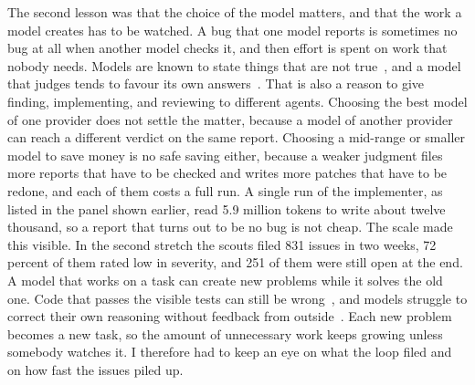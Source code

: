 \documentclass[11pt,a4paper]{article}
\begin{document}
The second lesson was that the choice of the model matters, and that the work a model creates has
to be watched.
A bug that one model reports is sometimes no bug at all when another model checks it, and then
effort is spent on work that nobody needs.
Models are known to state things that are not true~\cite{ji2023hallucination}, and a model that
judges tends to favour its own answers~\cite{zheng2023judge}.
That is also a reason to give finding, implementing, and reviewing to different agents.
Choosing the best model of one provider does not settle the matter, because a model of another
provider can reach a different verdict on the same report.
Choosing a mid-range or smaller model to save money is no safe saving either, because a weaker
judgment files more reports that have to be checked and writes more patches that have to be
redone, and each of them costs a full run.
A single run of the implementer, as listed in the panel shown earlier, read 5.9 million tokens to
write about twelve thousand, so a report that turns out to be no bug is not cheap.
The scale made this visible.
In the second stretch the scouts filed 831 issues in two weeks, 72 percent of them rated low in
severity, and 251 of them were still open at the end.
A model that works on a task can create new problems while it solves the old one.
Code that passes the visible tests can still be wrong~\cite{liu2023evalplus}, and models
struggle to correct their own reasoning without feedback from outside~\cite{huang2024selfcorrect}.
Each new problem becomes a new task, so the amount of unnecessary work keeps growing unless
somebody watches it.
I therefore had to keep an eye on what the loop filed and on how fast the issues piled up.
\end{document}
